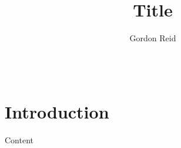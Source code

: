 \documentclass{acm_proc_article-sp}
\title{Title}
\author{
    \alignauthor
    Gordon Reid\\
    \affaddr{School of Computing Science}\\
    \affaddr{University of Glasgow}\\
    \email{1002536r@student.gla.ac.uk}
}
\begin{document}
\maketitle

\begin{abstract}

\end{abstract}

\section{Introduction}
Content



\end{document}

